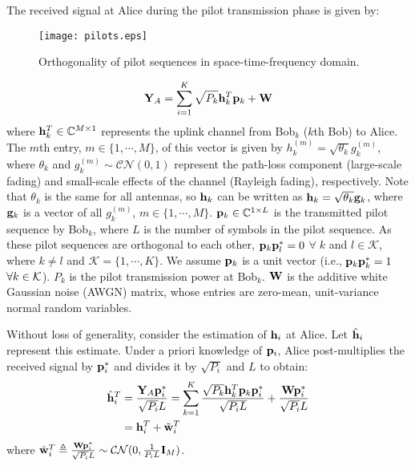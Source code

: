 \documentclass[draftclsnofoot, 12pt, onecolumn, journal]{IEEEtran}
\newcommand{\gv}{{\bf g}}
\newcommand{\hv}{{\bf h}}
\newcommand{\pv}{{\bf p}}
\newcommand{\wv}{{\bf w}}
\newcommand{\Id}{{\bf I}}
\newcommand{\Wm}{{\bf W}}
\newcommand{\Ym}{{\bf Y}}
\newcommand{\Kc}{{\cal K}}
\begin{document}
The received signal at Alice during the pilot transmission phase is given by:
%
\begin{figure}[!t]
\centering
\texttt{[image: pilots.eps]}
\caption{Orthogonality of pilot sequences in space-time-frequency domain.}
\label{fig:pilots}
\end{figure}
%
%
\begin{align}
\Ym_A = \sum_{i = 1}^{K} \sqrt{P_k}\hv_k^T \pv_k + \Wm
\end{align}
%
where $\hv_k^T \in \mathbb{C}^{M \times 1}$ represents the uplink channel from Bob$_k$ ($k$th Bob) to Alice.
The $m$th entry, $m \in \{ 1, \cdots, M \}$, of this vector is given by $ h_k^{(m)} = \sqrt{\theta_k}g_k^{(m)}$, where $\theta_k$ and $g_k^{(m)} \sim \mathcal{C} \mathcal{N} (0, 1)$ represent the path-loss component (large-scale fading) and small-scale effects of the channel (Rayleigh fading), respectively.
Note that $\theta_k$  is the same for all antennas, so $\hv_k$ can be written as $ \hv_k = \sqrt{\theta_k} \gv_k$, where $\gv_k$ is a vector of all $g_k^{(m)}$, $m \in \{ 1, \cdots, M \}$.
$\pv_k \in \mathbb{C}^{1 \times L}$ is the transmitted pilot sequence by Bob$_k$, where $L$ is the number of symbols in the pilot sequence.
As these pilot sequences are orthogonal to each other, $\pv_k \pv_l^*  = 0$ $\forall \; k$ and $l \in \mathcal{K}$, where $k \neq l$ and $ \mathcal{K} = \{ 1, \cdots, K \}$.
We assume $\pv_k$ is a unit vector (i.e., $\pv_k \pv_k^* = 1$ $\forall k \in \Kc$).
$P_k$ is the pilot transmission power at Bob$_k$.
$\Wm$ is the additive white Gaussian noise (AWGN) matrix, whose entries are zero-mean, unit-variance normal random variables.

Without loss of generality, consider the estimation of $\hv_i$ at Alice.
Let $\hat{\hv}_i$ represent this estimate.
Under a priori knowledge of $ \pv_i $, Alice post-multiplies the received signal by $ \pv_i^* $ and divides it by $\sqrt{P_i}$ and $L$ to obtain:
%
\begin{align}
\hat{\hv}_i^T & = \dfrac{\Ym_A \pv_i^*}{\sqrt{P_i} L} = \sum_{k = 1}^{K} \dfrac{\sqrt{P_k}\hv_k^T \pv_k \pv_i^* }{\sqrt{P_iL}} + \dfrac{\Wm \pv_i^* }{\sqrt{P_i}L} \nonumber \\
&= \hv_i^T + \tilde{\wv}_i^T
\label{eq:ch_est_wnoise}
\end{align}
where $\tilde{\wv}_i^T \triangleq \frac{\Wm \pv_i^* }{\sqrt{P_i}L} \sim \mathcal{C} \mathcal{N} (0, \frac{1}{P_i L} \Id_M)$.
\end{document}
